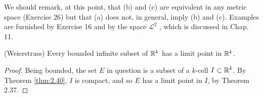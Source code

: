 We should remark, at this point, that (b) and (c) are equivalent in any
metric space (Exercise 26) but that (a) does not, in general, imply (b) and (c).
Examples are furnished by Exercise 16 and by the space $\mathscr{L}^2$ , which is discussed in Chap. 11.

\begin{thm}(Weierstrass)
    \label{thm:2.42}
    Every bounded infinite subset of ${\protect\mathbb R}^k$ has a limit point in ${\protect\mathbb R}^k$.
\end{thm}

\begin{proof}
    Being bounded, the set $E$ in question is a subset of a $k$-cell $I\subset {\protect\mathbb R}^k$.
    By Theorem \ref{thm:2.40}, $I$ is compact, 
    and so $E$ has a limit point in $I$, by Theorem 2.37.
\end{proof}